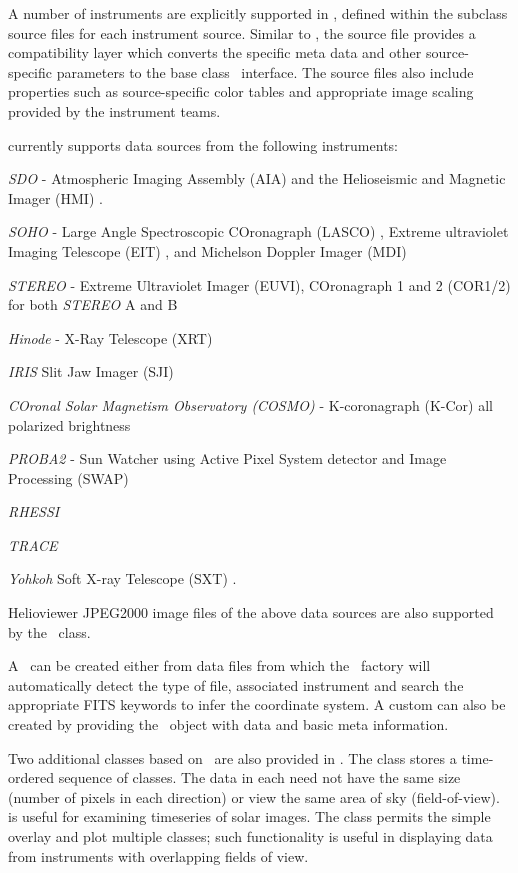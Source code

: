 A number of instruments are explicitly supported in \sunpypkg, defined within the subclass source files for each instrument source. 
Similar to \Timeseries, the source file provides a compatibility layer which converts the specific meta data and other source-specific parameters to the base class \GenericMap\ interface.
The source files also include properties such as source-specific color tables and appropriate image scaling provided by the instrument teams.

\Map currently supports data sources from the following instruments:
\begin{inparaitem}
\item \textit{SDO} - Atmospheric Imaging Assembly (AIA) \citep{lemen2011atmospheric} and the Helioseismic and Magnetic Imager (HMI) \citep{scherrer2012helioseismic}.
\item \textit{SOHO} - Large Angle Spectroscopic COronagraph (LASCO) \citep{brueckner1995large}, Extreme ultraviolet Imaging Telescope (EIT) \citep{delaboudiniere1995eit}, and Michelson Doppler Imager (MDI) \citep{scherrer1995solar}
\item \textit{STEREO} - Extreme Ultraviolet Imager (EUVI), COronagraph 1 and 2 (COR1/2) for both \textit{STEREO} A and B \citep{howard2008sun}
\item \textit{Hinode} - X-Ray Telescope (XRT) \citep{golub2008x}
\item \textit{IRIS} Slit Jaw Imager (SJI) \citep{DePontieu2014}
\item \textit{COronal Solar Magnetism Observatory (COSMO)} -  K-coronagraph (K-Cor) all polarized brightness
\item \textit{PROBA2} - Sun Watcher using Active Pixel System detector and Image Processing (SWAP) \citep{seaton2013swap}
\item \textit{RHESSI} \citep{lin2002reuven}
\item \textit{TRACE}
\item \textit{Yohkoh} Soft X-ray Telescope (SXT) \citep{tsuneta1991soft}.
\end{inparaitem}
Helioviewer JPEG2000 image files of the above data sources are also supported by the \Map\ class.

A \sunpypkg \Map\ can be created either from data files from which the \Map\ factory will automatically detect the type of file, associated instrument and search the appropriate FITS keywords to infer the coordinate system. 
A custom \GenericMap can also be created by providing the \Map\ object with data and basic meta information.

Two additional classes based on \Map\ are also provided in \sunpypkg.
The  class stores a time-ordered sequence of \Map classes.
The data in each \Map need not have the same size (number of pixels in each direction) or view the same area of sky (field-of-view).  is useful for examining timeseries of solar images.
The  class permits the simple overlay and plot multiple \Map classes; such functionality is useful in displaying data from instruments with overlapping fields of view.
